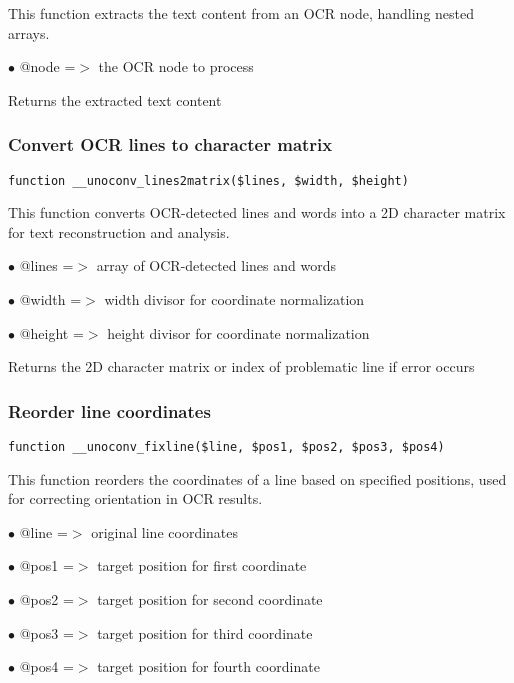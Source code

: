 \documentclass[a4paper]{article}
\begin{document}
This function extracts the text content from an OCR node, handling nested arrays.

\begin{compactitem}
\item[\color{myblue}$\bullet$] @node =$>$ the OCR node to process
\end{compactitem}

Returns the extracted text content

\hypertarget{toc545}{}
\subsubsection{Convert OCR lines to character matrix}

\begin{lstlisting}
function __unoconv_lines2matrix($lines, $width, $height)
\end{lstlisting}

This function converts OCR-detected lines and words into a 2D character matrix
for text reconstruction and analysis.

\begin{compactitem}
\item[\color{myblue}$\bullet$] @lines  =$>$ array of OCR-detected lines and words
\item[\color{myblue}$\bullet$] @width  =$>$ width divisor for coordinate normalization
\item[\color{myblue}$\bullet$] @height =$>$ height divisor for coordinate normalization
\end{compactitem}

Returns the 2D character matrix or index of problematic line if error occurs

\hypertarget{toc546}{}
\subsubsection{Reorder line coordinates}

\begin{lstlisting}
function __unoconv_fixline($line, $pos1, $pos2, $pos3, $pos4)
\end{lstlisting}

This function reorders the coordinates of a line based on specified positions,
used for correcting orientation in OCR results.

\begin{compactitem}
\item[\color{myblue}$\bullet$] @line =$>$ original line coordinates
\item[\color{myblue}$\bullet$] @pos1 =$>$ target position for first coordinate
\item[\color{myblue}$\bullet$] @pos2 =$>$ target position for second coordinate
\item[\color{myblue}$\bullet$] @pos3 =$>$ target position for third coordinate
\item[\color{myblue}$\bullet$] @pos4 =$>$ target position for fourth coordinate
\end{compactitem}
\end{document}
